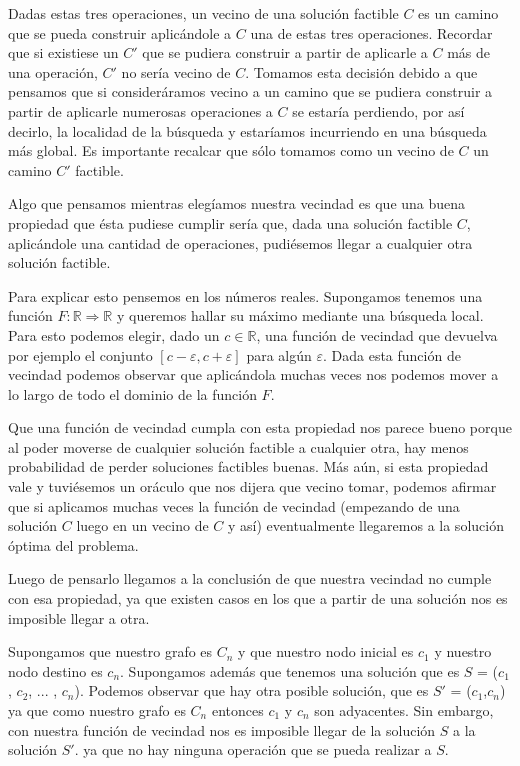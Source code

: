 Dadas estas tres operaciones, un vecino de una solución factible $C$ es un camino que se pueda construir aplicándole a $C$ una de estas tres operaciones. Recordar que si existiese un $C'$ que se pudiera construir a partir de aplicarle a $C$ más de una operación, $C'$ no sería vecino de $C$. Tomamos esta decisión debido a que pensamos que si consideráramos vecino a un camino que se pudiera construir a partir de aplicarle numerosas operaciones a $C$ se estaría perdiendo, por así decirlo, la localidad de la búsqueda y estaríamos incurriendo en una búsqueda más global. Es importante recalcar que sólo tomamos como un vecino de $C$ un camino $C'$ factible.

Algo que pensamos mientras elegíamos nuestra vecindad es que una buena propiedad que ésta pudiese cumplir sería que, dada una solución factible $C$, aplicándole una cantidad de operaciones, pudiésemos llegar a cualquier otra solución factible.

Para explicar esto pensemos en los números reales. Supongamos tenemos una función $F: \mathbb{R} \Rightarrow \mathbb{R}$ y queremos hallar su máximo mediante una búsqueda local. Para esto podemos elegir, dado un $c \in \mathbb{R}$, una función de vecindad que devuelva por ejemplo el conjunto $[c-\varepsilon, c+\varepsilon]$  para algún $\varepsilon$. Dada esta función de vecindad podemos observar que aplicándola muchas veces nos podemos mover a lo largo de todo el dominio de la función $F$.

Que una función de vecindad cumpla con esta propiedad nos parece bueno porque al poder moverse de cualquier solución factible a cualquier otra, hay menos probabilidad de perder soluciones factibles buenas. Más aún, si esta propiedad vale y tuviésemos un oráculo que nos dijera que vecino tomar, podemos afirmar que si aplicamos muchas veces la función de vecindad (empezando de una solución $C$ luego en un vecino de $C$ y así) eventualmente llegaremos a la solución óptima del problema.

Luego de pensarlo llegamos a la conclusión de que nuestra vecindad no cumple con esa propiedad, ya que existen casos en los que a partir de una solución nos es imposible llegar a otra.

Supongamos que nuestro grafo es $C_n$ y que nuestro nodo inicial es $c_1$ y nuestro nodo destino es $c_n$. Supongamos además que tenemos una solución que es $S$ = ($c_1$, $c_2$, ... , $c_n$). Podemos observar que hay otra posible solución, que es $S'$ = ($c_1$,$c_n$) ya que como nuestro grafo es $C_n$ entonces $c_1$ y $c_n$ son adyacentes. Sin embargo, con nuestra función de vecindad nos es imposible llegar de la solución $S$ a la solución $S'$. ya que no hay ninguna operación que se pueda realizar a $S$.

